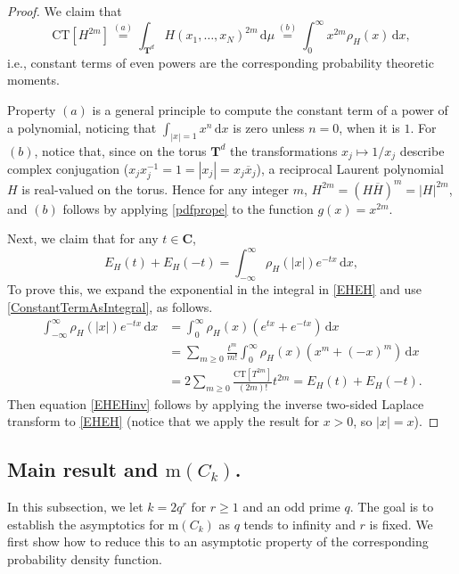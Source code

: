 \documentclass[12pt,reqno]{amsart}
\theoremstyle{definition}
\theoremstyle{plain}
\theoremstyle{definition}
\newcommand{\Cc}{\mathbf{C}}
\newcommand{\T}{\mathbf{T}}
\newcommand\m{\mathrm{m}}
\renewcommand{\geq}{\geqslant}
\renewcommand{\d}{\mathrm{d}}
\begin{document}
\begin{proof} 
We claim that 
\begin{equation}
\label{ConstantTermAsIntegral}
\text{CT}[H^{2m}] \overset{(a)}{=} \int_{\T^d} H(x_1, \ldots, x_N)^{2m} \, \d \mu \overset{(b)}{=} \int_0^\infty x^{2m} \rho_{H}(x) \, \d x,   
  \end{equation}
  i.e., constant terms of even powers are the corresponding probability theoretic moments. 
  
Property $(a)$ is a general principle to compute the constant term of a power of a polynomial, noticing that $\int_{|x|=1} x^n \, \d x$ is zero unless $n=0$, when it is $1$. For $(b)$, notice that, since on the torus $\T^d$ the transformations $x_j \mapsto 1/x_j$ describe complex conjugation ($x_j x_j^{-1} = 1 = |x_j| = x_j \overline x_j$), a reciprocal Laurent polynomial $H$ is real-valued on the torus. Hence for any integer $m$, $H^{2m} = (H \overline H)^m = |H|^{2m}$, and $(b)$ follows by applying \eqref{pdfprope} to the function $g(x)=x^{2m}$.  

Next, we claim that for any $t \in \Cc$,
  \begin{equation} \label{EHEH} E_H(t) + E_H(-t) = \int_{-\infty}^\infty \rho_{H}(|x|) e^{-t x} \, \d x, \end{equation} 
To prove this, we expand the exponential in the integral in \eqref{EHEH} and use \eqref{ConstantTermAsIntegral}, as follows. 
\begin{align*}
\int_{-\infty}^\infty \rho_{H}(|x|) e^{-t x} \, \d x &= \int_0^\infty \rho_{H}(x) \left( e^{t x} + e^{- t x} \right) \, \d x \\ &= \sum_{m \geq 0} \frac{t^m}{m!}  \int_0^\infty \rho_H(x) \left(x^m + (-x)^m \right) \, \d x\\
&=  2\sum_{m \geq 0}\frac{\text{CT}[T^{2m}]}{(2m)!}t^{2m} = E_H(t) + E_H(-t).
\end{align*}
Then equation \eqref{EHEHinv} follows by applying the  inverse two-sided Laplace transform  \cite[Section 4.7.2]{andrews1999integral} 
to \eqref{EHEH} (notice that we apply the result for $x>0$, so $|x|=x$).  
\end{proof}


\subsection{Main result and $\m(C_k)$.} 

In this subsection, we let $k = 2q^r$ for $r \geq 1$ and an odd prime $q$. The goal is to establish the asymptotics for $\m(C_k)$ as $q$ tends to infinity and $r$ is fixed. We first show how to reduce this to an asymptotic property of the corresponding probability density function. 
\end{document}
